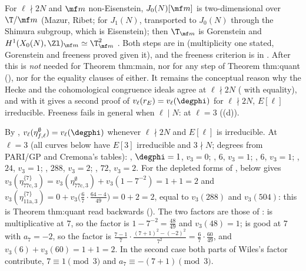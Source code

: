 \begin{remark}\label{rem:congruence:rem-free}
For $\ell\nmid2N$ and $\mf m$ non-Eisenstein, $J_0(N)[\mf m]$ is two-dimensional over $\T/\mf m$ (Mazur, Ribet; \cite[Theorem 3.5]{RibetStein} for $J_1(N)$, transported to $J_0(N)$ through the
Shimura subgroup, which is Eisenstein); then $\T_{\mf m}$ is Gorenstein and $H^1(X_0(N),\Zl)_{\mf m}\simeq\T_{\mf m}^2$ \cite{Tilouine97}. Both steps are in  (multiplicity one stated,
Gorenstein and freeness proved given it), and the freeness criterion is in . After  this is \emph{not} needed for Theorem thm:main, nor for any
step of Theorem thm:quant (), nor for the equality clauses of either. It remains the conceptual reason why the Hecke and the cohomological
congruence ideals agree at $\ell\nmid2N$ ( with equality), and with  it gives a second proof of $v_\ell(r_E)=v_\ell(\degphi)$ for
$\ell\nmid2N$, $E[\ell]$ irreducible. Freeness fails in general when $\ell\mid N$:  at $\ell=3$ ((d)).
\end{remark}

\begin{example}\label{ex:congruence:eta-values}
By , $v_\ell(\eta^\emptyset_{f,\ell})=v_\ell(\degphi)$ whenever $\ell\nmid2N$ and $E[\ell]$ is irreducible. At $\ell=3$ (all curves below have $E[3]$ irreducible and
$3\nmid N$; degrees from PARI/GP and Cremona's tables): , $\degphi=1$, $v_3=0$; , $6$, $v_3=1$; , $6$, $v_3=1$; , $24$, $v_3=1$; ,
$288$, $v_3=2$; , $72$, $v_3=2$. For the depleted forms of ,  below gives
$v_3(\eta^{\{7\}}_{\text{77c},3})=v_3(\eta^\emptyset_{\text{77c},3})+v_3(1-7^{-2})=1+1=2$ and $v_3(\eta^{\{7\}}_{\text{11a},3})=0+v_3\bigl(\frac67\cdot\frac{64-4}{49}\bigr)=0+2=2$, equal to $v_3(288)$ and $v_3(504)$:
this is Theorem thm:quant read backwards (). The two factors are those of :  is multiplicative at $7$, so the factor is
$1-7^{-2}=\frac{48}{49}$ and $v_3(48)=1$;  is good at $7$ with $a_7=-2$, so the factor is $\frac{7-1}7\cdot\frac{(7+1)^2-(-2)^2}{7^2}=\frac67\cdot\frac{60}{49}$, and $v_3(6)+v_3(60)=1+1=2$. In the second case both
parts of Wiles's factor contribute, $7\equiv1\pmod3$ and $a_7\equiv-(7+1)\pmod3$.
\end{example}

